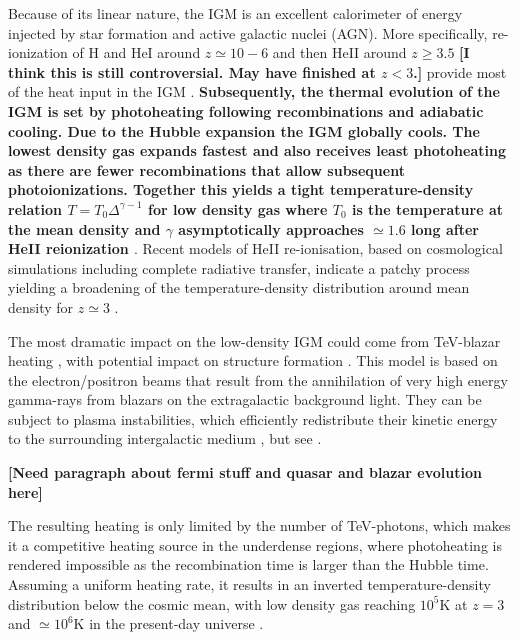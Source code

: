 \documentclass[numberedappendix]{emulateapj}
\newcommand\ALc[1]{{\color{red} \bf #1}} %
\newcommand\Ec[1]{{\color{magenta} \bf #1}} %
\begin{document}
Because of its linear nature, the IGM is an excellent calorimeter of energy injected by star formation and active galactic nuclei (AGN). More specifically, re-ionization of H and HeI around $z\simeq 10-6$ \citep{2006ARA&A..44..415F} and then HeII around $z\geqslant 3.5$ \Ec{[I think this is still controversial. May have finished at $z<3$.]} provide most of the heat input in the IGM \citep{2009ApJ...694..842M,2011ApJ...733L..24W}. \Ec{Subsequently, the thermal evolution of the IGM is set by photoheating following recombinations and adiabatic cooling. Due to the Hubble expansion the IGM globally cools. The lowest density gas expands fastest and also receives least photoheating as there are fewer recombinations that allow subsequent photoionizations. Together this yields a tight temperature-density relation $T=T_0 \Delta ^{\gamma-1}$ for low density gas where $T_0$ is the temperature at the mean density and $\gamma$ asymptotically approaches $\simeq 1.6$  long after HeII reionization \citep{1997MNRAS.292...27H,2015MNRAS.450.4081P,2016MNRAS.456...47M}}. Recent models of HeII re-ionisation, based on cosmological simulations including complete radiative transfer, indicate a patchy process yielding a broadening of the temperature-density distribution around mean density for $z\simeq 3$ \citep{2009ApJ...694..842M,2012MNRAS.423....7M,2013MNRAS.435.3169C}.

The most dramatic impact on the low-density IGM could come from TeV-blazar heating \citep{2012ApJ...752...23C,2012MNRAS.423..149P,2015ApJ...811...19L}, with potential impact on structure formation \citep{2012ApJ...752...24P}. This model is based on the electron/positron beams that result from the annihilation of very high energy gamma-rays from blazars on the extragalactic background light. They can be subject to plasma instabilities, which efficiently redistribute their kinetic energy to the surrounding intergalactic medium \citep{2012ApJ...752...22B,2013ApJ...777...49S,2012ApJ...758..102S,2014ApJ...797..110C,2016ApJ...833..118C},  but see \citet{2013ApJ...770...54M,2014ApJ...787...49S}.  

\ALc{[Need paragraph about fermi stuff and quasar and blazar evolution here]}

The resulting heating is only limited by the number of TeV-photons, which makes it a competitive heating source in the underdense regions, where photoheating is rendered impossible as the recombination time is larger than the Hubble time.  Assuming a uniform heating rate, it results in an inverted temperature-density distribution below the cosmic mean, with low density gas reaching  $10^5$K at $z=3$ and $\simeq 10^6$K in the present-day universe \citep{2012MNRAS.423..149P}.  
\end{document}

